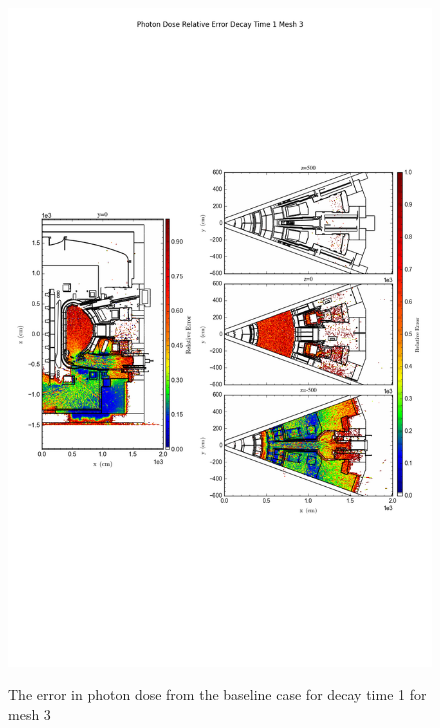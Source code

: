 \begin{figure}[ht!]
\centering
\includegraphics[trim={0cm 9cm 0cm 10cm},clip,scale=0.75]{../plots/final_model/Photon_Dose_Relative_Error_Decay_Time_1_Mesh_3.png}
\label{fig:photons_dc1_no4bc_m3_error}
\caption{The error in photon dose from the baseline case for decay time 1 for mesh 3}
\end{figure}
